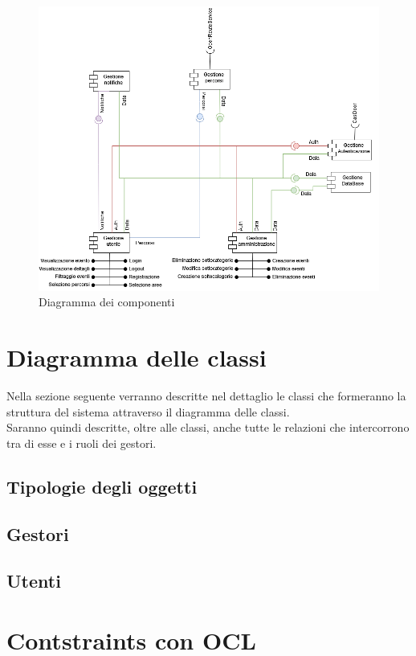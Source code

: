 \documentclass{article}
\begin{document}
\begin{figure}[htbp]
    \centering
    \includegraphics[width=1\textwidth]{Images/ComponentDiagram.png}
    \caption{Diagramma dei componenti}
    \label{fig:component-diagram}
\end{figure}

\clearpage

\section{Diagramma delle classi}

Nella sezione seguente verranno descritte nel dettaglio le classi che formeranno la struttura del sistema attraverso il diagramma delle classi.\\
Saranno quindi descritte, oltre alle classi, anche tutte le relazioni che intercorrono tra di esse e i ruoli dei gestori.

\subsection{Tipologie degli oggetti}

\clearpage

\subsection{Gestori}

\clearpage

\subsection{Utenti}

\clearpage

\section{Contstraints con OCL}
\end{document}

